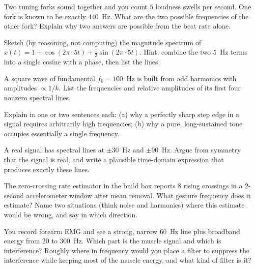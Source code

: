 \begin{exercise}
Two tuning forks sound together and you count $5$ loudness swells per second. One fork
is known to be exactly $440$~Hz. What are the two possible frequencies of the other
fork? Explain why two answers are possible from the beat rate alone.
\end{exercise}

\begin{exercise}
Sketch (by reasoning, not computing) the magnitude spectrum of
$x(t) = 1 + \cos(2\pi\cdot 5 t) + \tfrac12\sin(2\pi\cdot 5 t)$. Hint: combine the two
$5$~Hz terms into a single cosine with a phase, then list the lines.
\end{exercise}

\begin{exercise}
A square wave of fundamental $f_0 = 100$~Hz is built from odd harmonics with
amplitudes $\propto 1/k$. List the frequencies and relative amplitudes of its first
four nonzero spectral lines.
\end{exercise}

\begin{exercise}
Explain in one or two sentences each: (a) why a perfectly sharp step edge in a signal
requires arbitrarily high frequencies; (b) why a pure, long-sustained tone occupies
essentially a single frequency.
\end{exercise}

\begin{exercise}
A real signal has spectral lines at $\pm 30$~Hz and $\pm 90$~Hz. Argue from symmetry
that the signal is real, and write a plausible time-domain expression that produces
exactly these lines.
\end{exercise}

\begin{exercise}
The zero-crossing rate estimator in the build box reports $8$ rising crossings in a
$2$-second accelerometer window after mean removal. What gesture frequency does it
estimate? Name two situations (think noise and harmonics) where this estimate would
be wrong, and say in which direction.
\end{exercise}

\begin{exercise}
You record forearm EMG and see a strong, narrow $60$~Hz line plus broadband energy
from $20$ to $300$~Hz. Which part is the muscle signal and which is interference?
Roughly where in frequency would you place a filter to suppress the interference
while keeping most of the muscle energy, and what kind of filter is it?
\end{exercise}

